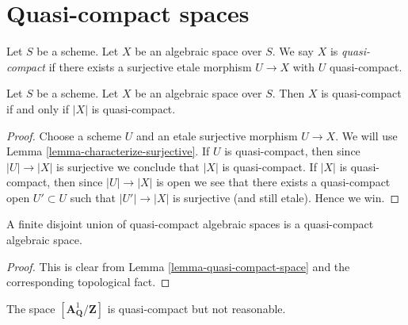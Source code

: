 














\section{Quasi-compact spaces}
\label{section-quasi-compact}

\begin{definition}
\label{definition-quasi-compact}
Let $S$ be a scheme.
Let $X$ be an algebraic space over $S$.
We say $X$ is {\it quasi-compact} if there exists a surjective
etale morphism $U \to X$ with $U$ quasi-compact.
\end{definition}

\begin{lemma}
\label{lemma-quasi-compact-space}
Let $S$ be a scheme.
Let $X$ be an algebraic space over $S$.
Then $X$ is quasi-compact if and only if $|X|$ is quasi-compact.
\end{lemma}

\begin{proof}
Choose a scheme $U$ and an etale surjective morphism $U \to X$.
We will use Lemma \ref{lemma-characterize-surjective}.
If $U$ is quasi-compact, then since $|U| \to |X|$ is surjective
we conclude that $|X|$ is quasi-compact.
If $|X|$ is quasi-compact, then since $|U| \to |X|$ is open
we see that there exists a quasi-compact open $U' \subset U$
such that $|U'| \to |X|$ is surjective (and still etale).
Hence we win.
\end{proof}

\begin{lemma}
\label{lemma-finite-disjoint-quasi-compact}
A finite disjoint union of quasi-compact algebraic spaces is
a quasi-compact algebraic space.
\end{lemma}

\begin{proof}
This is clear from
Lemma \ref{lemma-quasi-compact-space}
and the corresponding topological fact.
\end{proof}

\begin{example}
\label{example-quasi-compact-unreasonable}
The space $[\mathbf{A}^1_{\mathbf{Q}}/\mathbf{Z}]$ is
quasi-compact but not reasonable.
\end{example}






